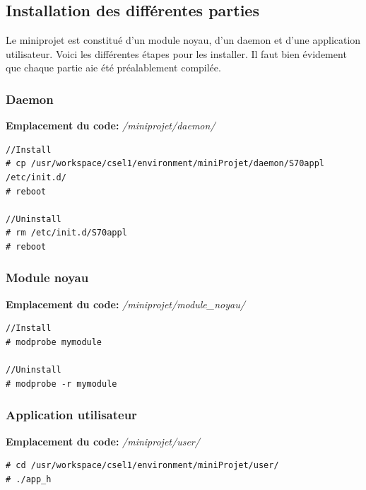 \subsection{Installation des différentes parties}
Le miniprojet est constitué d'un module noyau, d'un daemon et d'une application utilisateur. Voici les différentes étapes pour les installer. Il faut bien évidement que chaque partie aie été préalablement compilée.
\subsubsection{Daemon}
\textbf{Emplacement du code: }\textit{/miniprojet/daemon/}\\
\begin{lstlisting}
//Install
# cp /usr/workspace/csel1/environment/miniProjet/daemon/S70appl /etc/init.d/
# reboot

//Uninstall
# rm /etc/init.d/S70appl
# reboot
\end{lstlisting}
\subsubsection{Module noyau}
\textbf{Emplacement du code: }\textit{/miniprojet/module\_noyau/}\\
\begin{lstlisting}
//Install
# modprobe mymodule

//Uninstall
# modprobe -r mymodule
\end{lstlisting}
\subsubsection{Application utilisateur}
\textbf{Emplacement du code: }\textit{/miniprojet/user/}\\
\begin{lstlisting}
# cd /usr/workspace/csel1/environment/miniProjet/user/
# ./app_h 
\end{lstlisting}
